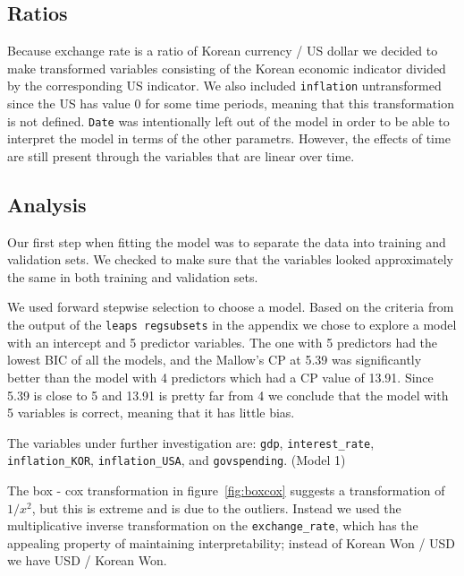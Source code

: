 \documentclass[12pt]{article}
\begin{document}
\subsection{Ratios}

Because exchange rate is a ratio of Korean currency / US dollar we decided
to make transformed variables consisting of the Korean economic indicator
divided by the corresponding US indicator. We also included
\texttt{inflation} untransformed since the US has value 0 for some time
periods, meaning that this transformation is not defined.
\texttt{Date} was intentionally left out of the model in order
to be able to interpret the model in terms of the other parametrs. However,
the effects of time are still present through the variables that are linear
over time.

\subsection{Analysis}

Our first step when fitting the model was to separate the data into
training and validation sets. We checked to make sure that the variables
looked approximately the same in both training and validation sets.

We used forward stepwise selection to choose a model. 
Based on the criteria from the output of the \texttt{leaps regsubsets}
in the appendix we chose to explore a
model with an intercept and 5 predictor variables. The one with 5
predictors had the lowest BIC of all the models, and the Mallow's CP at
5.39 was significantly better than the model with 4 predictors which had a
CP value of 13.91. Since 5.39 is close to 5 and 13.91 is pretty far from 4
we conclude that the model with 5 variables is correct, meaning that it has
little bias.

The variables under further investigation are:
\texttt{gdp}, \texttt{interest\_rate}, \texttt{inflation\_KOR}, 
\texttt{inflation\_USA}, and \texttt{govspending}. (Model 1)

The box - cox transformation in figure~\ref{fig:boxcox} suggests a
transformation of $1 / x^2$, but this is extreme and is due to the
outliers. Instead we used the multiplicative inverse transformation on the
\texttt{exchange\_rate}, which has the appealing property of maintaining
interpretability; instead of Korean Won / USD we have USD / Korean Won.
\end{document}
